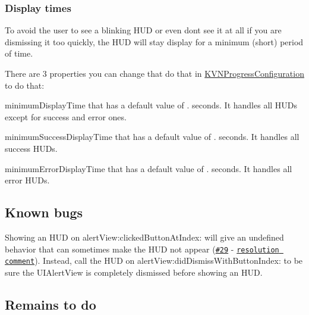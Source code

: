 \subsubsection*{Display times}

To avoid the user to see a blinking H\+UD or even don\textquotesingle{}t see it at all if you are dismissing it too quickly, the H\+UD will stay display for a minimum (short) period of time.

There are 3 properties you can change that do that in {\ttfamily \mbox{\hyperlink{interface_k_v_n_progress_configuration}{K\+V\+N\+Progress\+Configuration}}} to do that\+:


\begin{DoxyItemize}
\item {\ttfamily minimum\+Display\+Time} that has a default value of {.} seconds. It handles all H\+UD\textquotesingle{}s except for success and error ones.
\item {\ttfamily minimum\+Success\+Display\+Time} that has a default value of {.} seconds. It handles all success H\+UD\textquotesingle{}s.
\item {\ttfamily minimum\+Error\+Display\+Time} that has a default value of {.} seconds. It handles all error H\+UD\textquotesingle{}s.
\end{DoxyItemize}

\subsection*{Known bugs}


\begin{DoxyItemize}
\item Showing an H\+UD on {\ttfamily alert\+View\+:clicked\+Button\+At\+Index\+:} will give an undefined behavior that can sometimes make the H\+UD not appear (\href{https://github.com/kevin-hirsch/KVNProgress/issues/29}{\tt \#29} -\/ \href{https://github.com/kevin-hirsch/KVNProgress/issues/29#issuecomment-77602300}{\tt resolution comment}). Instead, call the H\+UD on {\ttfamily alert\+View\+:did\+Dismiss\+With\+Button\+Index\+:} to be sure the {\ttfamily U\+I\+Alert\+View} is completely dismissed before showing an H\+UD.
\end{DoxyItemize}

\subsection*{Remains to do}


